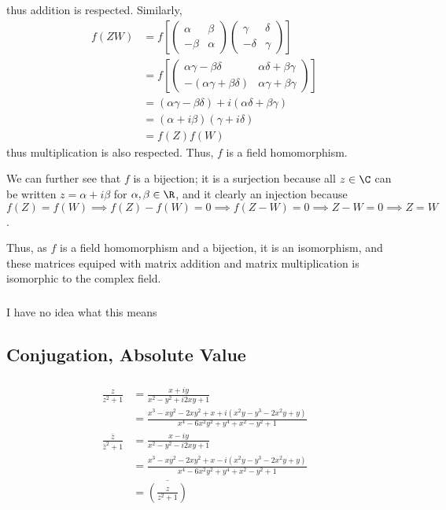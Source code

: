 thus addition is respected. Similarly,
\begin{align*}
	f(ZW) &= f\left[ \begin{pmatrix}
		\alpha & \beta\\
		-\beta & \alpha
	\end{pmatrix} \begin{pmatrix}
		\gamma & \delta\\
		-\delta & \gamma
	\end{pmatrix}\right] \\
	&= f\left[ \begin{pmatrix}
		\alpha\gamma-\beta\delta & \alpha\delta + \beta\gamma\\
		-(\alpha\gamma+\beta\delta) & \alpha\gamma + \beta\gamma
	\end{pmatrix}\right]\\
	&=(\alpha\gamma-\beta\delta)+i(\alpha\delta+\beta\gamma)\\
	&=(\alpha + i\beta)(\gamma+i\delta)\\
	&= f(Z)f(W)
\end{align*}
thus multiplication is also respected. Thus, \(f\) is a field homomorphism.

We can further see that \(f\) is a bijection; it is a surjection because all \(z\in\C\) can be written \(z=\alpha+i\beta\) for \(\alpha,\beta\in \R\), and it clearly an injection because \(f(Z)=f(W)\implies f(Z)-f(W)=0\implies f(Z-W)=0\implies Z-W=0\implies Z=W\). 

Thus, as \(f\) is a field homomorphism and a bijection, it is an isomorphism, and these matrices equiped with matrix addition and matrix multiplication is isomorphic to the complex field. 
\subsubsection{}
I have no idea what this means
\subsection{Conjugation, Absolute Value}
\subsubsection{}
\begin{align*}
	\frac{z}{z^2+1}&= \frac{x+iy}{x^2-y^2+i2xy+1}\\
		       &=\frac{x^3-xy^2-2xy^2+x+i(x^2y-y^3-2x^2y+y)}{x^4-6x^2y^2 + y^4+x^2-y^2+1}\\
	\frac{\bar z}{\bar z^2+1}&= \frac{x-iy}{x^2-y^2-i2xy+1}\\
		       &=\frac{x^3-xy^2-2xy^2+x-i(x^2y-y^3-2x^2y+y)}{x^4-6x^2y^2 + y^4+x^2-y^2+1}\\
		       &=\overline{\left(\frac{z}{z^2+1}\right)}
\end{align*}
